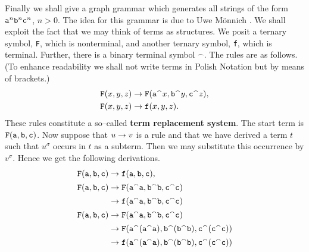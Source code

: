 Finally we shall give a graph grammar which generates all
strings of the form $\mbox{\tt a}^n \mbox{\tt b}^n
\mbox{\tt c}^n$, $n>0$. The idea for this grammar is due to
Uwe M\"onnich 
. We shall exploit
the fact that we may think of terms as structures. We posit
a ternary symbol, {\tt F}, which is nonterminal, and another
ternary symbol, {\tt f}, which is terminal. Further, there
is a binary terminal symbol $^{\smallfrown}$. The rules are
as follows. (To enhance readability we shall not write terms
in Polish Notation but by means of brackets.)
\begin{equation}
\begin{split}
\mbox{\tt F}(x, y, z) & \rightarrow \mbox{\tt F}(\mbox{\tt a}{^{\smallfrown}x},
\mbox{\tt b}{^{\smallfrown}y},
    \mbox{\tt c}{^{\smallfrown}z}), \\
\mbox{\tt F}(x,y,z) & \rightarrow \mbox{\tt f}(x,y,z). \\
\end{split}
\end{equation}
These rules constitute a so--called \textbf{term replacement system}.
The start term is $\mbox{\tt F}(\mbox{\tt a}, \mbox{\tt b}, \mbox{\tt c})$.
Now suppose that $u \rightarrow v$ is a rule and that we have derived
a term $t$ such that $u^{\sigma}$ occurs in $t$ as a subterm.
Then we may substitute this occurrence by $v^{\sigma}$.
Hence we get the following derivations.
\begin{equation}
\begin{split}
\mbox{\tt F}(\mbox{\tt a},\mbox{\tt b},\mbox{\tt c}) &
    \rightarrow \mbox{\tt f}(\mbox{\tt a},\mbox{\tt b},\mbox{\tt c}), \\
\mbox{\tt F}(\mbox{\tt a},\mbox{\tt b},\mbox{\tt c}) &
    \rightarrow \mbox{\tt F}(\mbox{\tt a}{^{\smallfrown}\mbox{\tt a}},
        \mbox{\tt b}{^{\smallfrown}\mbox{\tt b}},
    \mbox{\tt c}{^{\smallfrown}\mbox{\tt c}}) \\
    & \rightarrow \mbox{\tt f}(\mbox{\tt a}{^{\smallfrown}\mbox{\tt a}},
    \mbox{\tt b}{^{\smallfrown}\mbox{\tt b}},
        \mbox{\tt c}{^{\smallfrown}\mbox{\tt c}}) \\
\mbox{\tt F}(\mbox{\tt a},\mbox{\tt b},\mbox{\tt c}) &
    \rightarrow \mbox{\tt F}(\mbox{\tt a}{^{\smallfrown}\mbox{\tt a}},
        \mbox{\tt b}{^{\smallfrown}\mbox{\tt b}},
    \mbox{\tt c}{^{\smallfrown}\mbox{\tt c}}) \\
	&
    \rightarrow \mbox{\tt F}(\mbox{\tt a}{^{\smallfrown}{(\mbox{\tt
        a}^{\smallfrown}\mbox{\tt a})}},
    \mbox{\tt b}{^{\smallfrown}{(\mbox{\tt
        b}^{\smallfrown}\mbox{\tt b})}},
    \mbox{\tt c}{^{\smallfrown}{(\mbox{\tt
        c}^{\smallfrown}\mbox{\tt c})}}) \\
    & \rightarrow \mbox{\tt f}(\mbox{\tt a}{^{\smallfrown}{(\mbox{\tt
        a}^{\smallfrown}\mbox{\tt a})}},
    \mbox{\tt b}{^{\smallfrown}{(\mbox{\tt
        b}^{\smallfrown}\mbox{\tt b})}},
    \mbox{\tt c}{^{\smallfrown}{(\mbox{\tt
        c}^{\smallfrown}\mbox{\tt c})}})
\end{split}
\end{equation}
